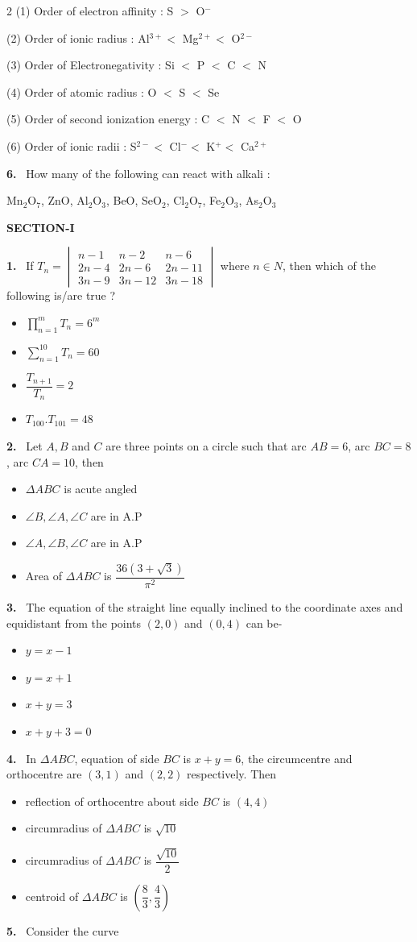 \documentclass[10pt]{extarticle}
\newcommand{\partsec}[2]{\par\medskip\noindent{\large\bfseries PART-#1: #2}\par\smallskip}
\newcommand{\sect}[1]{\par\smallskip\noindent\textbf{#1}\par}
\newcommand{\qn}[1]{\par\smallskip\noindent\textbf{#1.}~}
\newenvironment{qoptions}{\begin{itemize}[leftmargin=1.8em,itemsep=1pt,topsep=2pt,label={}]}{\end{itemize}}
\newcommand{\opt}[2]{\item[(#1)] #2}
\begin{document}
\begin{multicols}{2}
(1) Order of electron affinity : S $>$ O$^-$

(2) Order of ionic radius : Al$^{3+}<$ Mg$^{2+}<$ O$^{2-}$

(3) Order of Electronegativity : Si $<$ P $<$ C $<$ N

(4) Order of atomic radius : O $<$ S $<$ Se

(5) Order of second ionization energy : C $<$ N $<$ F $<$ O

(6) Order of ionic radii : S$^{2-}<$ Cl$^-<$ K$^+<$ Ca$^{2+}$
\qn{6} How many of the following can react with alkali :

Mn$_2$O$_7$, ZnO, Al$_2$O$_3$, BeO, SeO$_2$, Cl$_2$O$_7$, Fe$_2$O$_3$, As$_2$O$_3$
\columnbreak
\partsec{3}{MATHEMATICS}
\sect{SECTION-I}
\qn{1} If $T_n=\begin{vmatrix}n-1&n-2&n-6\\2n-4&2n-6&2n-11\\3n-9&3n-12&3n-18\end{vmatrix}$ where $n\in N$, then which of the following is/are true ?
\begin{qoptions}
\opt{A}{$\displaystyle\prod_{n=1}^{m}T_n=6^m$}
\opt{B}{$\displaystyle\sum_{n=1}^{10}T_n=60$}
\opt{C}{$\dfrac{T_{n+1}}{T_n}=2$}
\opt{D}{$T_{100}.T_{101}=48$}
\end{qoptions}
\qn{2} Let $A,B$ and $C$ are three points on a circle such that arc $AB=6$, arc $BC=8$, arc $CA=10$, then
\begin{qoptions}
\opt{A}{$\Delta ABC$ is acute angled}
\opt{B}{$\angle B,\angle A,\angle C$ are in A.P}
\opt{C}{$\angle A,\angle B,\angle C$ are in A.P}
\opt{D}{Area of $\Delta ABC$ is $\dfrac{36\left(3+\sqrt3\right)}{\pi^2}$}
\end{qoptions}
\qn{3} The equation of the straight line equally inclined to the coordinate axes and equidistant from the points $(2,0)$ and $(0,4)$ can be-
\begin{qoptions}
\opt{A}{$y=x-1$}
\opt{B}{$y=x+1$}
\opt{C}{$x+y=3$}
\opt{D}{$x+y+3=0$}
\end{qoptions}
\qn{4} In $\Delta ABC$, equation of side $BC$ is $x+y=6$, the circumcentre and orthocentre are $(3,1)$ and $(2,2)$ respectively. Then
\begin{qoptions}
\opt{A}{reflection of orthocentre about side $BC$ is $(4,4)$}
\opt{B}{circumradius of $\Delta ABC$ is $\sqrt{10}$}
\opt{C}{circumradius of $\Delta ABC$ is $\dfrac{\sqrt{10}}2$}
\opt{D}{centroid of $\Delta ABC$ is $\left(\dfrac83,\dfrac43\right)$}
\end{qoptions}
\qn{5} Consider the curve

\end{multicols}
\end{document}
